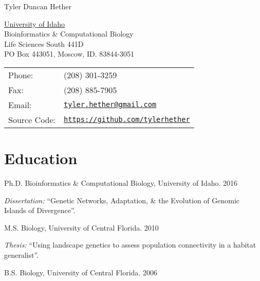 \documentclass[letterpaper]{article}
\def\name{Tyler Duncan Hether}
\renewenvironment{itemize}{
  \begin{list}{}{
    \setlength{\leftmargin}{1.5em}
  }
}{
  \end{list}
}
\begin{document}
{\huge \name}


\vspace{0.25in}

\begin{minipage}{0.45\linewidth}
  \href{https://www.uidaho.edu/}{University of Idaho} \\
  Bioinformatics \& Computational Biology \\
  Life Sciences South 441D \\
  PO Box 443051, Moscow, ID. 83844-3051
\end{minipage}
\begin{minipage}{0.45\linewidth}
  \begin{tabular}{ll}
    Phone: & (208) 301-3259 \\
    Fax: &  (208) 885-7905 \\
    Email: & \href{mailto:tyler.hether@gmail.com}{\tt tyler.hether@gmail.com} \\
    Source Code: & \href{https://github.com/tylerhether}{\tt https://github.com/tylerhether} \\
  \end{tabular}
\end{minipage}





\section*{Education}

\begin{itemize}
  \item Ph.D. Bioinformatics \& Computational Biology, University of Idaho. 2016
    \begin{itemize}
    \item \emph{Dissertation:} ``Genetic Networks, Adaptation,
  \& the Evolution of Genomic Islands of Divergence''.
    \end{itemize}
  \item M.S. Biology, University of Central Florida.
    2010
    \begin{itemize}
    \item \emph{Thesis:} ``Using landscape genetics to assess population connectivity in a habitat generalist''.
    \end{itemize}
  \item B.S. Biology, University of Central Florida.
    2006
\end{itemize}
\end{document}

